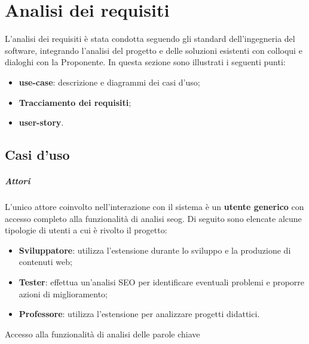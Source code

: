 \chapter{Analisi dei requisiti}
\label{cap:analisi-requisiti}

\par L'analisi dei \gls{requisiti} è stata condotta seguendo gli standard dell'ingegneria del software, integrando l'analisi del progetto e delle soluzioni esistenti con colloqui e dialoghi con la Proponente. In questa sezione sono illustrati i seguenti punti:
\begin{itemize}
    \item \textbf{\gls{use-case}}: descrizione e diagrammi dei casi d'uso;
    \item \textbf{Tracciamento dei requisiti};
    \item \textbf{\gls{user-story}}.
\end{itemize}

\section{Casi d'uso}

\paragraph*{Attori}
\par L'unico attore coinvolto nell'interazione con il sistema è un \textbf{utente generico} con accesso completo alla funzionalità di analisi \gls{seog}. Di seguito sono elencate alcune tipologie di utenti a cui è rivolto il progetto:
\begin{itemize}
    \item \textbf{Sviluppatore}: utilizza l'estensione durante lo sviluppo e la produzione di contenuti web;
    \item \textbf{Tester}: effettua un'analisi SEO per identificare eventuali problemi e proporre azioni di miglioramento;
    \item \textbf{Professore}: utilizza l'estensione per analizzare progetti didattici.
\end{itemize}

\begin{usecase}{1}{Accesso alla funzionalità di analisi delle parole chiave}\label{UC1}
\end{usecase}

